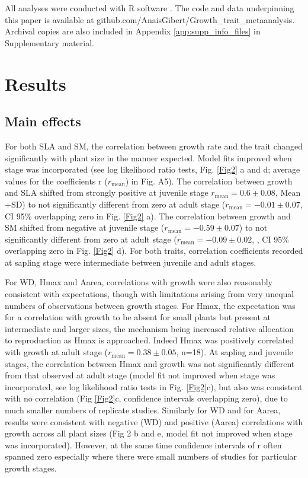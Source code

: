 \documentclass[a4paper]{article}\usepackage[]{graphicx}\usepackage[]{color}
\begin{document}
All analyses were conducted with R software \citep{Ralanguageanden:2014wf}. The code and data underpinning this paper is available at github.com/AnaisGibert/Growth\_trait\_metaanalysis. Archival copies are also included in Appendix \ref{app:supp_info_files} in Supplementary material.

\section*{Results}\label{results}

\subsection*{Main effects}

For both SLA and SM, the correlation between growth rate and the trait changed significantly with plant size in the manner expected. Model fits improved when stage was incorporated (see log likelihood ratio tests, Fig. \ref{Fig2} a and d; average values for the coefficients r ($r_{\textrm{mean}}$) in Fig. A5). The correlation between growth and SLA shifted from strongly positive at juvenile stage $r_{\textrm{mean}}=0.6 \pm 0.08$, Mean +SD) to not significantly different from zero at adult stage ($r_{\textrm{mean}}= -0.01 \pm 0.07$, CI 95\% overlapping zero in Fig. \ref{Fig2} a). The correlation between growth and SM shifted from negative at juvenile stage ($r_{\textrm{mean}}= -0.59 \pm 0.07$) to not significantly different from zero at adult stage ($r_{\textrm{mean}}= -0.09 \pm 0.02$, , CI 95\% overlapping zero in Fig. \ref{Fig2} d). For both traits,  correlation coefficients recorded at sapling stage were intermediate between juvenile and adult stages. 

For WD, Hmax and Aarea, correlations with growth were also reasonably consistent with expectations, though with limitations arising from very unequal numbers of observations between growth stages. For Hmax, the expectation was for a correlation with growth to be absent for small plants but present at intermediate and larger sizes, the mechanism being increased relative allocation to reproduction as Hmax is approached. Indeed Hmax was positively correlated with growth at adult stage ($r_{\textrm{mean}}= 0.38 \pm 0.05$, n=18). At sapling and juvenile stages, the correlation between Hmax and growth was not significantly different from that observed at adult stage (model fit not improved when stage was incorporated, see log likelihood ratio tests in Fig. \ref{Fig2}c), but also was consistent with no correlation (Fig \ref{Fig2}c, confidence intervals overlapping zero), due to much smaller numbers of replicate studies. Similarly for WD and for Aarea, results were consistent with negative (WD) and positive (Aarea) correlations with growth across all plant sizes (Fig 2 b and e, model fit not improved when stage was incorporated). However, at the same time confidence intervals of r often spanned zero especially where there were small numbers of studies for particular growth stages. 
\end{document}
